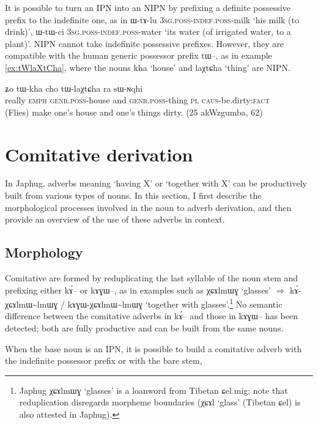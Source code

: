 \documentclass[oldfontcommands,oneside,a4paper,11pt]{article}
\newcommand{\ipa}[1]{{\phon #1}} %
\newcommand{\tld}{\textasciitilde{}}
\begin{document}
It is possible to turn an IPN into an NIPN by prefixing a definite possessive prefix to the indefinite one, as in \ipa{ɯ-tɤ-lu} \textsc{3sg.poss-indef.poss}-milk `his milk (to drink)', \ipa{ɯ-tɯ-ci} \textsc{3sg.poss-indef.poss}-water `its water (of irrigated water, to a plant)'. NIPN cannot take indefinite possessive prefixes. However, they are compatible with the human generic possessor prefix \ipa{tɯ--}, as in example \ref{ex:tWlaXtCha}, where the nouns \ipa{kha} `house' and \ipa{laχtɕha} `thing' are NIPN.

\begin{exe}
\ex \label{ex:tWlaXtCha}
\gll  \ipa{wuma}  	\ipa{ʑo}  	\ipa{tɯ-kha}  	\ipa{cho}  	\ipa{tɯ-laχtɕha}  	\ipa{ra}  	\ipa{sɯ-ɴqhi}  \\
really \textsc{emph} \textsc{genr.poss}-house and \textsc{genr.poss}-thing \textsc{pl} \textsc{caus}-be.dirty:\textsc{fact} \\
\glt (Flies) make one's house and one's things dirty. (25 akWzgumba, 62)
\end{exe}


 
 \section{Comitative derivation} 
In Japhug, adverbs meaning `having X' or `together with X' can be productively built from various types of nouns. In this section, I first describe the morphological processes involved in the noun to adverb derivation, and then provide an overview of the use of these adverbs in context.

\subsection{Morphology}
Comitative are formed by reduplicating the last syllable of the noun stem and prefixing either \ipa{kɤ́--} or \ipa{kɤɣɯ--}, as in examples such as \ipa{χɕɤlmɯɣ} `glasses' $\Rightarrow$ \ipa{kɤ́-χɕɤlmɯ\tld{}lmɯɣ} / \ipa{kɤɣɯ-χɕɤlmɯ\tld{}lmɯɣ} `together with glasses'.\footnote{Japhug \ipa{χɕɤlmɯɣ} `glasses' is a loanword from Tibetan \ipa{ɕel.mig}; note that reduplication disregards morpheme boundaries (\ipa{χɕɤl} `glass' (Tibetan \ipa{ɕel}) is also attested in Japhug). } No semantic difference between the comitative adverbs in \ipa{kɤ́--} and those in \ipa{kɤɣɯ--} has been detected; both are fully productive and can be built from the same nouns.

When the base noun is an IPN, it is possible to build a comitative adverb with the indefinite possessor prefix or with the bare stem, 
\end{document}

